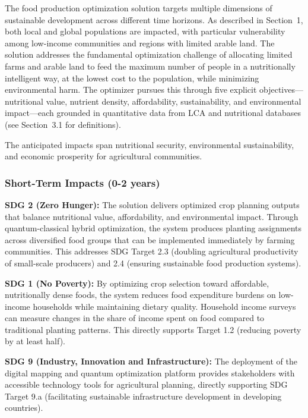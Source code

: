 \documentclass{oqireport}
\begin{document}
The food production optimization solution targets multiple dimensions of sustainable development across different time horizons. As described in Section~1, both local and global populations are impacted, with particular vulnerability among low-income communities and regions with limited arable land. The solution addresses the fundamental optimization challenge of allocating limited farms and arable land to feed the maximum number of people in a nutritionally intelligent way, at the lowest cost to the population, while minimizing environmental harm. The optimizer pursues this through five explicit objectives---nutritional value, nutrient density, affordability, sustainability, and environmental impact---each grounded in quantitative data from LCA and nutritional databases (see Section~3.1 for definitions).

The anticipated impacts span nutritional security, environmental sustainability, and economic prosperity for agricultural communities.

\subsubsection{Short-Term Impacts (0-2 years)}

\textbf{SDG 2 (Zero Hunger):} The solution delivers optimized crop planning outputs that balance nutritional value, affordability, and environmental impact. Through quantum-classical hybrid optimization, the system produces planting assignments across diversified food groups that can be implemented immediately by farming communities. This addresses SDG Target 2.3 (doubling agricultural productivity of small-scale producers) and 2.4 (ensuring sustainable food production systems).

\textbf{SDG 1 (No Poverty):} By optimizing crop selection toward affordable, nutritionally dense foods, the system reduces food expenditure burdens on low-income households while maintaining dietary quality. Household income surveys can measure changes in the share of income spent on food compared to traditional planting patterns. This directly supports Target 1.2 (reducing poverty by at least half).

\textbf{SDG 9 (Industry, Innovation and Infrastructure):} The deployment of the digital mapping and quantum optimization platform provides stakeholders with accessible technology tools for agricultural planning, directly supporting SDG Target 9.a (facilitating sustainable infrastructure development in developing countries).
\end{document}
